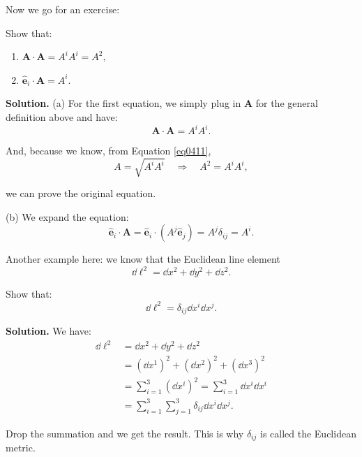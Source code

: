 \documentclass[10pt]{article}
\begin{document}
	Now we go for an exercise:
	\begin{exercise}
		Show that:
		\begin{enumerate}
			\item {$\mathbf{A} \cdot \mathbf{A} = A^{i}A^{i} = A^{2},$}
			\item {$\hat{\mathbf{e}}_{i} \cdot \mathbf{A} = A^{i}.$}
		\end{enumerate}

		\vspace{1\baselineskip}
		\textbf{Solution.} (a) For the first equation, we simply plug in $\mathbf{A}$ for the general definition above and have:
		\begin{equation}
		  \mathbf{A} \cdot \mathbf{A} = A^{i}A^{i}.
		\end{equation}

		And, because we know, from Equation \ref{eq0411},
		\begin{equation}
		  A = \sqrt{A^{i}A^{i}} \quad \Rightarrow \quad A^{2} = A^{i}A^{i},
		\end{equation}

		we can prove the original equation.

		\vspace{1\baselineskip}
		(b) We expand the equation:
		\begin{equation}
		  \hat{\mathbf{e}}_{i} \cdot \mathbf{A} = \hat{\mathbf{e}}_{i} \cdot (A^{j}\hat{\mathbf{e}}_{j}) = A^{j}\delta_{ij} = A^{i}.
		\end{equation}
	\end{exercise}

	Another example here: we know that the Euclidean line element
	\begin{equation}
	  \dd \ell ^{2} = \dd x^{2} + \dd y^{2} + \dd z^{2}.
	\end{equation}

	\begin{example}
		Show that:
		\begin{equation}
		  \dd \ell^{2} = \delta_{ij} \dd x^{i} \dd x^{j}.
		\end{equation}

		\vspace{1\baselineskip}
		\textbf{Solution.} We have:
		\begin{equation}
		  \begin{aligned}
		  \dd \ell^{2} &= \dd x^{2} + \dd y^{2} + \dd z^{2} \\
		  &= (\dd x^{1})^{2} + (\dd x^{2})^{2} + (\dd x^{3})^{2} \\
		  &= \sum_{i=1}^{3} (\dd x^{i})^{2} = \sum_{i=1}^{3} \dd x^{i} \dd x^{i} \\
		  &= \sum_{i=1}^{3} \sum_{j=1}^{3} \delta_{ij} \dd x^{i} \dd x^{j}.
		  \end{aligned}
		\end{equation}

		Drop the summation and we get the result. This is why $\delta_{ij}$ is called the Euclidean metric.
	\end{example}
\end{document}
